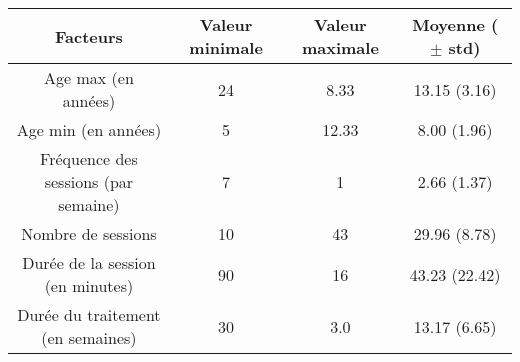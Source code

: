 \fontsize{9}{11}\selectfont
\begin{tabular}{ cccc }
\toprule
Facteurs & Valeur minimale & Valeur maximale & Moyenne ($\pm$ std) \\
\midrule
Age max (en années) & 24 & 8.33 & 13.15 (3.16) \\
Age min (en années) & 5 & 12.33 & 8.00 (1.96) \\
Fréquence des sessions (par semaine) & 7 & 1 & 2.66 (1.37) \\
Nombre de sessions & 10 & 43 & 29.96 (8.78) \\
Durée de la session (en minutes) & 90 & 16 & 43.23 (22.42) \\
Durée du traitement (en semaines) & 30 & 3.0 & 13.17 (6.65) \\
\bottomrule
\end{tabular}